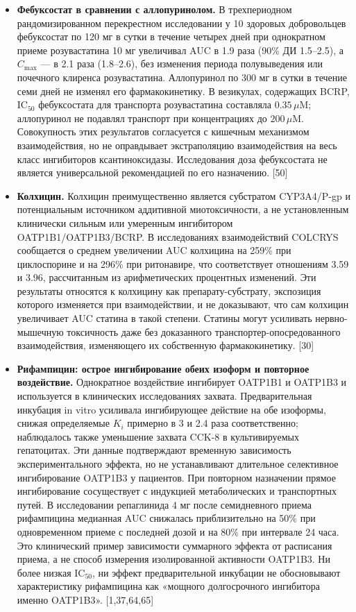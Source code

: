 \documentclass[11pt]{article}
\begin{document}
\begin{itemize}
\item \textbf{Фебуксостат в сравнении с аллопуринолом.} В трехпериодном рандомизированном перекрестном исследовании у 10 здоровых добровольцев фебуксостат по 120 мг в сутки в течение четырех дней при однократном приеме розувастатина 10 мг увеличивал AUC в 1.9 раза (90\% ДИ 1.5--2.5), а \(C_{\max}\) --- в 2.1 раза (1.8--2.6), без изменения периода полувыведения или почечного клиренса розувастатина. Аллопуринол по 300 мг в сутки в течение семи дней не изменял его фармакокинетику. В везикулах, содержащих BCRP, \(\mathrm{IC}_{50}\) фебуксостата для транспорта розувастатина составляла \(0.35\,\mu\mathrm{M}\); аллопуринол не подавлял транспорт при концентрациях до \(200\,\mu\mathrm{M}\). Совокупность этих результатов согласуется с кишечным механизмом взаимодействия, но не оправдывает экстраполяцию взаимодействия на весь класс ингибиторов ксантиноксидазы. Исследования доза фебуксостата не является универсальной рекомендацией по его назначению. [50]
\item \textbf{Колхицин.} Колхицин преимущественно является субстратом CYP3A4/P-gp и потенциальным источником аддитивной миотоксичности, а не установленным клинически сильным или умеренным ингибитором OATP1B1/OATP1B3/BCRP. В исследованиях взаимодействий COLCRYS сообщается о среднем увеличении AUC колхицина на 259\% при циклоспорине и на 296\% при ритонавире, что соответствует отношениям 3.59 и 3.96, рассчитанным из арифметических процентных изменений. Эти результаты относятся к колхицину как препарату-субстрату, экспозиция которого изменяется при взаимодействии, и не доказывают, что сам колхицин увеличивает AUC статина в такой степени. Статины могут усиливать нервно-мышечную токсичность даже без доказанного транспортер-опосредованного взаимодействия, изменяющего их собственную фармакокинетику. [30]
\item \textbf{Рифампицин: острое ингибирование обеих изоформ и повторное воздействие.} Однократное воздействие ингибирует OATP1B1 и OATP1B3 и используется в клинических исследованиях захвата. Предварительная инкубация in vitro усиливала ингибирующее действие на обе изоформы, снижая определяемые \(K_i\) примерно в 3 и 2.4 раза соответственно; наблюдалось также уменьшение захвата CCK-8 в культивируемых гепатоцитах. Эти данные подтверждают временную зависимость экспериментального эффекта, но не устанавливают длительное селективное ингибирование OATP1B3 у пациентов. При повторном назначении прямое ингибирование сосуществует с индукцией метаболических и транспортных путей. В исследовании репаглинида 4 мг после семидневного приема рифампицина медианная AUC снижалась приблизительно на 50\% при одновременном приеме с последней дозой и на 80\% при интервале 24 часа. Это клинический пример зависимости суммарного эффекта от расписания приема, а не способ измерения изолированной активности OATP1B3. Ни более низкая \(\mathrm{IC}_{50}\), ни эффект предварительной инкубации не обосновывают характеристику рифампицина как «мощного долгосрочного ингибитора именно OATP1B3». [1,37,64,65]
\end{itemize}
\end{document}
